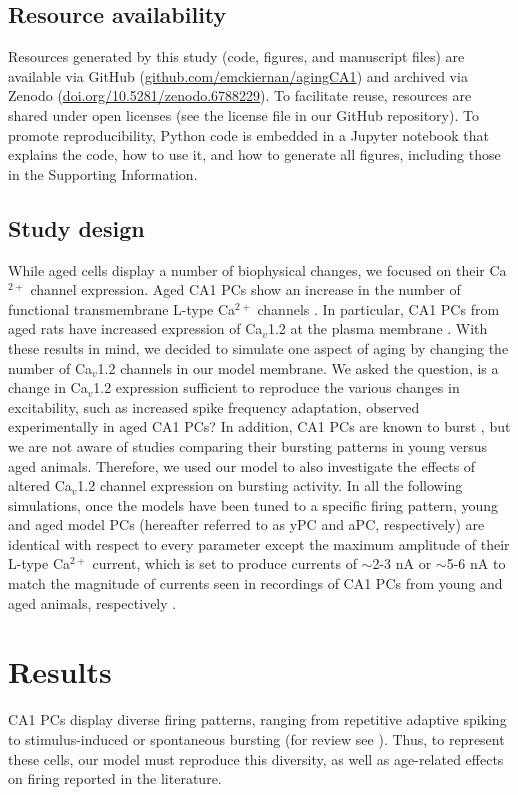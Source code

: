 \documentclass[10pt,letterpaper]{article}
\newcommand{\Ca}{Ca$^{2+}$}
\begin{document}
\subsection*{Resource availability}
Resources generated by this study (code, figures, and manuscript files) are available via GitHub (\href{https://github.com/emckiernan/agingCA1}{github.com/emckiernan/agingCA1}) and archived via Zenodo (\href{https://doi.org/10.5281/zenodo.6788229}{doi.org/10.5281/zenodo.6788229}). To facilitate reuse, resources are shared under open licenses (see the license file in our GitHub repository). To promote reproducibility, Python code is embedded in a Jupyter notebook \cite{kluyver2016jupyter} that explains the code, how to use it, and how to generate all figures, including those in the Supporting Information.

\subsection*{Study design}
While aged cells display a number of biophysical changes, we focused on their {\Ca} channel expression. Aged CA1 PCs show an increase in the number of functional transmembrane L-type {\Ca} channels  \cite{herman1998up,thibault1996increase,veng2002regionally}. In particular, CA1 PCs from aged rats have increased expression of Ca$_v$1.2 at the plasma membrane \cite{nunez2014surface}. With these results in mind, we decided to simulate one aspect of aging by changing the number of Ca$_v$1.2 channels in our model membrane. We asked the question, is a change in Ca$_v$1.2 expression sufficient to reproduce the various changes in excitability, such as increased spike frequency adaptation, observed experimentally in aged CA1 PCs? In addition, CA1 PCs are known to burst \cite{mckiernan2017ca1}, but we are not aware of studies comparing their bursting patterns in young versus aged animals. Therefore, we used our model to also investigate the effects of altered Ca$_v$1.2 channel expression on bursting activity. In all the following simulations, once the models have been tuned to a specific firing pattern, young and aged model PCs (hereafter referred to as yPC and aPC, respectively) are identical with respect to every parameter except the maximum amplitude of their L-type {\Ca} current, which is set to produce currents of $\sim$2-3 nA or $\sim$5-6 nA to match the magnitude of currents seen in recordings of CA1 PCs from young and aged animals, respectively \cite{campbell1996aging}. 

\section*{Results}
CA1 PCs display diverse firing patterns, ranging from repetitive adaptive spiking to stimulus-induced or spontaneous bursting (for review see \cite{mckiernan2017ca1}). Thus, to represent these cells, our model must reproduce this diversity, as well as age-related effects on firing reported in the literature.  
\end{document}
